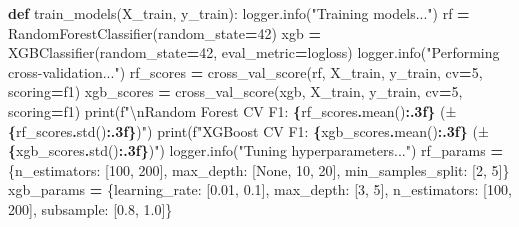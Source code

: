 \documentclass[preprint, 3p,
authoryear]{elsarticle} %
\newenvironment{Shaded}{\begin{snugshade}}{\end{snugshade}}
\newcommand{\BuiltInTok}[1]{#1}
\newcommand{\CharTok}[1]{\textcolor[rgb]{0.31,0.60,0.02}{#1}}
\newcommand{\DecValTok}[1]{\textcolor[rgb]{0.00,0.00,0.81}{#1}}
\newcommand{\FloatTok}[1]{\textcolor[rgb]{0.00,0.00,0.81}{#1}}
\newcommand{\KeywordTok}[1]{\textcolor[rgb]{0.13,0.29,0.53}{\textbf{#1}}}
\newcommand{\NormalTok}[1]{#1}
\newcommand{\OperatorTok}[1]{\textcolor[rgb]{0.81,0.36,0.00}{\textbf{#1}}}
\newcommand{\SpecialCharTok}[1]{\textcolor[rgb]{0.81,0.36,0.00}{\textbf{#1}}}
\newcommand{\SpecialStringTok}[1]{\textcolor[rgb]{0.31,0.60,0.02}{#1}}
\newcommand{\StringTok}[1]{\textcolor[rgb]{0.31,0.60,0.02}{#1}}
\newcommand{\VariableTok}[1]{\textcolor[rgb]{0.00,0.00,0.00}{#1}}
\begin{document}
\begin{Shaded}
\begin{Highlighting}[]
\KeywordTok{def}\NormalTok{ train\_models(X\_train, y\_train):}
\NormalTok{    logger.info(}\StringTok{"Training models..."}\NormalTok{)}
\NormalTok{    rf }\OperatorTok{=}\NormalTok{ RandomForestClassifier(random\_state}\OperatorTok{=}\DecValTok{42}\NormalTok{)}
\NormalTok{    xgb }\OperatorTok{=}\NormalTok{ XGBClassifier(random\_state}\OperatorTok{=}\DecValTok{42}\NormalTok{, eval\_metric}\OperatorTok{=}\StringTok{\textquotesingle{}logloss\textquotesingle{}}\NormalTok{)}
\NormalTok{    logger.info(}\StringTok{"Performing cross{-}validation..."}\NormalTok{)}
\NormalTok{    rf\_scores }\OperatorTok{=}\NormalTok{ cross\_val\_score(rf, X\_train, y\_train, cv}\OperatorTok{=}\DecValTok{5}\NormalTok{, scoring}\OperatorTok{=}\StringTok{\textquotesingle{}f1\textquotesingle{}}\NormalTok{)}
\NormalTok{    xgb\_scores }\OperatorTok{=}\NormalTok{ cross\_val\_score(xgb, X\_train, y\_train, cv}\OperatorTok{=}\DecValTok{5}\NormalTok{, scoring}\OperatorTok{=}\StringTok{\textquotesingle{}f1\textquotesingle{}}\NormalTok{)}
    \BuiltInTok{print}\NormalTok{(}\SpecialStringTok{f"}\CharTok{\textbackslash{}n}\SpecialStringTok{Random Forest CV F1: }\SpecialCharTok{\{}\NormalTok{rf\_scores}\SpecialCharTok{.}\NormalTok{mean()}\SpecialCharTok{:.3f\}}\SpecialStringTok{ (±}\SpecialCharTok{\{}\NormalTok{rf\_scores}\SpecialCharTok{.}\NormalTok{std()}\SpecialCharTok{:.3f\}}\SpecialStringTok{)"}\NormalTok{)}
    \BuiltInTok{print}\NormalTok{(}\SpecialStringTok{f"XGBoost CV F1: }\SpecialCharTok{\{}\NormalTok{xgb\_scores}\SpecialCharTok{.}\NormalTok{mean()}\SpecialCharTok{:.3f\}}\SpecialStringTok{ (±}\SpecialCharTok{\{}\NormalTok{xgb\_scores}\SpecialCharTok{.}\NormalTok{std()}\SpecialCharTok{:.3f\}}\SpecialStringTok{)"}\NormalTok{)}
\NormalTok{    logger.info(}\StringTok{"Tuning hyperparameters..."}\NormalTok{)}
\NormalTok{    rf\_params }\OperatorTok{=}\NormalTok{ \{}\StringTok{\textquotesingle{}n\_estimators\textquotesingle{}}\NormalTok{: [}\DecValTok{100}\NormalTok{, }\DecValTok{200}\NormalTok{], }\StringTok{\textquotesingle{}max\_depth\textquotesingle{}}\NormalTok{: [}\VariableTok{None}\NormalTok{, }\DecValTok{10}\NormalTok{, }\DecValTok{20}\NormalTok{], }\StringTok{\textquotesingle{}min\_samples\_split\textquotesingle{}}\NormalTok{: [}\DecValTok{2}\NormalTok{, }\DecValTok{5}\NormalTok{]\}}
\NormalTok{    xgb\_params }\OperatorTok{=}\NormalTok{ \{}\StringTok{\textquotesingle{}learning\_rate\textquotesingle{}}\NormalTok{: [}\FloatTok{0.01}\NormalTok{, }\FloatTok{0.1}\NormalTok{], }\StringTok{\textquotesingle{}max\_depth\textquotesingle{}}\NormalTok{: [}\DecValTok{3}\NormalTok{, }\DecValTok{5}\NormalTok{], }\StringTok{\textquotesingle{}n\_estimators\textquotesingle{}}\NormalTok{: [}\DecValTok{100}\NormalTok{, }\DecValTok{200}\NormalTok{], }\StringTok{\textquotesingle{}subsample\textquotesingle{}}\NormalTok{: [}\FloatTok{0.8}\NormalTok{, }\FloatTok{1.0}\NormalTok{]\}}

\end{Highlighting}
\end{Shaded}
\end{document}

